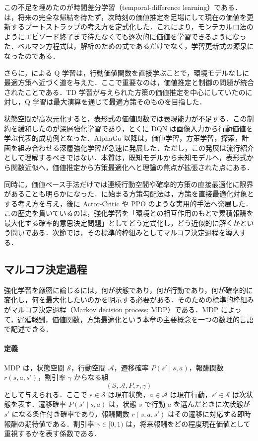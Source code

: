この不足を埋めたのが時間差分学習（temporal-difference learning）である．\citet{Sutton1988}は，将来の完全な帰結を待たず，次時刻の価値推定を足場にして現在の価値を更新するブートストラップの考え方を定式化した．これにより，モンテカルロ法のようにエピソード終了まで待たなくても逐次的に価値を学習できるようになった．ベルマン方程式は，解析のための式であるだけでなく，学習更新式の源泉になったのである．

さらに，\citet{WatkinsDayan1992}による Q 学習は，行動価値関数を直接学ぶことで，環境モデルなしに最適方策へ近づく道を与えた．ここで重要なのは，価値推定と制御の問題が統合されたことである．TD 学習が与えられた方策の価値推定を中心にしていたのに対し，Q 学習は最大演算を通じて最適方策そのものを目指した．

状態空間が高次元化すると，表形式の価値関数では表現能力が不足する．この制約を緩和したのが深層強化学習であり，とくに DQN は画像入力から行動価値を学ぶ代表的成功例となった\cite{Mnih2015}．AlphaGo 以降は，価値学習，方策学習，探索，計画を組み合わせる深層強化学習が急速に発展した\cite{Silver2016}．ただし，この発展は流行紹介として理解するべきではない．本質は，既知モデルから未知モデルへ，表形式から関数近似へ，価値推定から方策最適化へと理論の焦点が拡張された点にある．

同時に，価値ベース手法だけでは連続行動空間や確率的方策の直接最適化に限界があることも明らかになった．\citet{Williams1992}に始まる方策勾配法は，方策を直接最適化対象とする考え方を与え，後に Actor-Critic や PPO のような実用的手法へ発展した\cite{Schulman2015,Schulman2017}．この歴史を貫いているのは，強化学習を「環境との相互作用のもとで累積報酬を最大化する確率的意思決定問題」としてどう定式化し，どう近似的に解くかという問いである．次節では，その標準的枠組みとしてマルコフ決定過程を導入する．

\subsection{マルコフ決定過程}

強化学習を厳密に論じるには，何が状態であり，何が行動であり，何が確率的に変化し，何を最大化したいのかを明示する必要がある．そのための標準的枠組みがマルコフ決定過程（Markov decision process; MDP）である．MDP によって，遅延報酬，価値関数，方策最適化という本章の主要概念を一つの数理的言語で記述できる．

\paragraph*{定義}
MDP は，状態空間 $\mathcal{S}$，行動空間 $\mathcal{A}$，遷移確率 $P(s' \mid s,a)$，報酬関数 $r(s,a,s')$，割引率 $\gamma$ からなる組
\begin{equation*}
(\mathcal{S}, \mathcal{A}, P, r, \gamma)
\end{equation*}
として与えられる．ここで $s \in \mathcal{S}$ は現在状態，$a \in \mathcal{A}$ は現在行動，$s' \in \mathcal{S}$ は次状態を表す．遷移確率 $P(s' \mid s,a)$ は，状態 $s$ で行動 $a$ を選んだときに次状態が $s'$ になる条件付き確率であり，報酬関数 $r(s,a,s')$ はその遷移に対応する即時報酬の期待値である．割引率 $\gamma \in [0,1)$ は，将来報酬をどの程度現在価値として重視するかを表す係数である．

